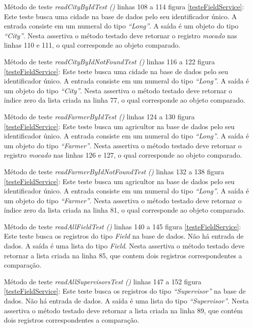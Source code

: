 Método de teste \textit{ readCityByIdTest ()} linhas 108 a 114 figura \ref{testeFieldService}: Este teste busca uma cidade na base de dados pelo seu identificador único. A entrada consiste em um numeral do tipo \textit{“Long”}. A saída é um objeto do tipo \textit{“City”}. Nesta assertiva o método testado deve retornar o registro \textit{mocado} nas linhas 110 e 111, o qual corresponde ao objeto comparado. 

Método de teste \textit{ readCityByIdNotFoundTest ()} linhas 116 a 122 figura \ref{testeFieldService}: Este teste busca uma cidade na base de dados pelo seu identificador único. A entrada consiste em um numeral do tipo \textit{“Long”}. A saída é um objeto do tipo \textit{“City”}. Nesta assertiva o método testado deve retornar o índice zero da lista criada na linha 77, o qual corresponde ao objeto comparado.

Método de teste \textit{ readFarmerByIdTest ()} linhas 124 a 130 figura \ref{testeFieldService}: Este teste busca um agricultor na base de dados pelo seu identificador único. A entrada consiste em um numeral do tipo \textit{“Long”}. A saída é um objeto do tipo \textit{“Farmer”}. Nesta assertiva o método testado deve retornar o registro \textit{mocado} nas linhas 126 e 127, o qual corresponde ao objeto comparado.

Método de teste \textit{ readFarmerByIdNotFoundTest ()} linhas 132 a 138 figura \ref{testeFieldService}: Este teste busca um agricultor na base de dados pelo seu identificador único. A entrada consiste em um numeral do tipo \textit{“Long”}. A saída é um objeto do tipo \textit{“Farmer”}. Nesta assertiva o método testado deve retornar o índice zero da lista criada na linha 81, o qual corresponde ao objeto comparado.


Método de teste \textit{ readAllFieldTest ()} linhas 140 a 145 figura \ref{testeFieldService}: Este teste busca os registros do tipo \textit{Field} na base de dados. Não há entrada de dados.  A saída é uma lista do tipo \textit{Field}. Nesta assertiva o método testado deve retornar a lista criada na linha 85, que contem dois registros correspondentes a comparação.

Método de teste \textit{readAllSupervisorsTest ()} linhas 147 a 152 figura \ref{testeFieldService}: Este teste busca os registros do tipo \textit{“Supervisor”} na base de dados. Não há entrada de dados.  A saída é uma lista do tipo \textit{“Supervisor”}. Nesta assertiva o método testado deve retornar a lista criada na linha 89, que contém dois registros correspondentes a comparação.

